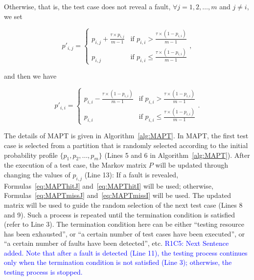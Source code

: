 \documentclass[10pt,journal,compsoc]{IEEEtran}
\begin{document}
Otherwise, that is, the test case does not reveal a fault, $\forall j = 1, 2, \ldots, m$ and $j \neq i$, we set

\begin{equation}
\label{eq:MAPTmissJ}
p'_{i,j} =
\begin{cases}
p_{i,j} + \displaystyle\frac{\tau \times p_{i,j}}{m-1} & \text{if } p_{i,i} > \displaystyle\frac{\tau \times (1-p_{i,i})}{m-1} \\
p_{i,j} & \text{if } p_{i,i} \leq \displaystyle\frac{\tau \times (1-p_{i,i})}{m-1}
\end{cases},
\end{equation}

and then we have

\begin{equation}
\label{eq:MAPTmissI}
p'_{i,i} =
\begin{cases}
p_{i,i} - \displaystyle\frac{\tau \times (1-p_{i,i})}{m-1} & \text{if } p_{i,i} > \displaystyle\frac{\tau \times (1-p_{i,i})}{m-1} \\
p_{i,i} & \text{if } p_{i,i} \leq \displaystyle\frac{\tau \times (1-p_{i,i})}{m-1}
\end{cases}.
\end{equation}

The details of MAPT is given in Algorithm~\ref{alg:MAPT}. In MAPT, the first test case is selected from a partition that is randomly selected according to the initial probability profile $\{p_1, p_2, \ldots, p_m\}$ (Lines 5 and 6 in Algorithm~\ref{alg:MAPT}). After the execution of a test case, the Markov matrix $P$ will be updated through changing the values of $p_{i,j}$ (Line 13): If a fault is revealed, Formulas~\ref{eq:MAPThitJ} and~\ref{eq:MAPThitI} will be used; otherwise, Formulas~\ref{eq:MAPTmissJ} and~\ref{eq:MAPTmissI} will be used. The updated matrix will be used to guide the random selection of the next test case (Lines 8 and 9). Such a process is repeated until the termination condition is satisfied (refer to Line 3). The termination condition here can be either ``testing resource has been exhausted'', or ``a certain number of test cases have been executed'', or ``a certain number of faults have been detected'', etc. \textcolor{blue}{R1C5: Next Sentence added.
Note that after a fault is detected (Line 11), the testing process continues only when the termination condition is not satisfied (Line 3); otherwise, the testing process is stopped.}
\end{document}
